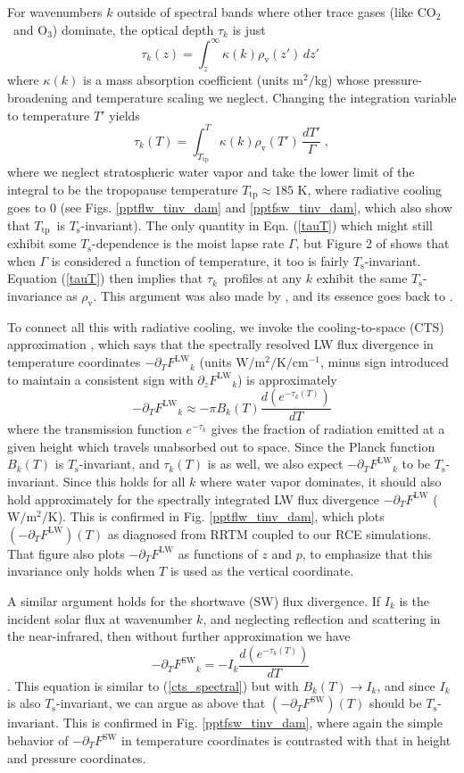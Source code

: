 \documentclass[10pt]{article}
\newcommand{\beqn}{\begin{equation}}
\newcommand{\eeqn}{\end{equation}}
\newcommand{\eqnref}[1]{(\ref{#1})}
\newcommand{\der}[2]{\ensuremath{\frac{d #1}{d #2}}}
\newcommand{\ppz}{\ensuremath{\partial_z}}
\newcommand{\ppt}{\ensuremath{\partial_T}}
\newcommand{\cotwo}{\ensuremath{\mathrm{CO_2}}}
\newcommand{\othree}{\ensuremath{\mathrm{O_3}}}
\newcommand{\FLW}{\ensuremath{F^\mathrm{LW}}}
\newcommand{\FSW}{\ensuremath{F^\mathrm{SW}}}
\newcommand{\cminverse}{\ensuremath{\mathrm{cm^{-1}}}}
\newcommand{\tauk}{\ensuremath{\tau_k}}
\newcommand{\Wmsq}{\ensuremath{\mathrm{W/m^2}}}
\newcommand{\rhov}{\ensuremath{\rho_\mathrm{v}}}
\newcommand{\Ts}{\ensuremath{T_\mathrm{s}}}
\newcommand{\Ttp}{\ensuremath{T_\mathrm{tp}}}
\begin{document}
	For wavenumbers $k$ outside of spectral bands where other trace gases (like \cotwo\ and \othree) dominate, the optical depth $\tauk$ is just
	\beqn
		\tau_k(z) = \int_z^\infty \kappa(k)  \rhov(z') \, dz'  \; 
		\label{tauz}
	\eeqn
		where $\kappa(k)$ is a  mass absorption coefficient  (units $\mathrm{m^2/kg}$) whose pressure-broadening and temperature scaling we neglect. Changing the integration variable to temperature $T'$ yields
		\beqn
		\tau_k(T) = \int_{\Ttp}^T \kappa(k)  \rhov(T') \, \frac{dT'}{\Gamma}  \; ,
		\label{tauT}
	\eeqn
	where we neglect stratospheric water vapor and take the lower limit of the integral to be the tropopause temperature $\Ttp \approx 185$ K, where radiative cooling goes to 0 (see Figs. \ref{pptflw_tinv_dam} and  \ref{pptfsw_tinv_dam}, which also show that \Ttp\ is \Ts-invariant). The only quantity in Eqn. \eqnref{tauT} which might still exhibit some \Ts-dependence is the  moist lapse rate $\Gamma$, but Figure 2 of \cite{ingram2010} shows that when $\Gamma$ is considered a function of temperature, it too is fairly  \Ts-invariant. Equation \eqnref{tauT} then implies that \tauk\ profiles at any $k$ exhibit the same \Ts-invariance as \rhov. This argument was also made by \cite{ingram2010}, and its essence goes back to  \cite{simpson1928}.
	
	To connect all this with radiative cooling, we invoke the cooling-to-space (CTS) approximation \citep[e.g.,][]{thomas2002}, which says that the spectrally resolved LW flux divergence in temperature coordinates $-\ppt \FLW_k$ (units $\Wmsq/\mathrm{K}/\cminverse$, minus sign introduced to maintain a consistent sign with  $\ppz \FLW_k$) is approximately
	\beqn
		-\ppt \FLW_k \approx - \pi B_k(T) \frac{d (e^{-\tauk(T)})}{dT}
	\label{cts_spectral}
	\eeqn
where  the transmission function $e^{-\tauk}$ gives the fraction of radiation emitted at a given height which travels unabsorbed out to space. Since the Planck function $B_k(T)$ is \Ts-invariant, and $\tauk(T)$ is as well, we also expect $-\ppt \FLW_k$ to be \Ts-invariant. Since this holds for all $k$ where water vapor dominates, it should also hold approximately for the spectrally integrated LW flux divergence $-\ppt \FLW$ ($\Wmsq/\mathrm{K}$). This is confirmed in  Fig.  \ref{pptflw_tinv_dam}, which plots $(-\ppt \FLW)(T)$ as diagnosed from RRTM coupled to our  RCE simulations.  That figure also plots $-\ppt \FLW$ as functions of $z$ and $p$, to emphasize that this invariance only holds  when $T$ is used as the vertical coordinate.
	
	A similar argument holds for the shortwave (SW) flux divergence. If $I_k$ is the incident solar flux at wavenumber $k$, and  neglecting reflection and scattering in the  near-infrared, 
then without further approximation we have
	\beqn
		-\ppt \FSW_k = - I_k \der{(e^{-\tauk(T)})}{T}
		\
	\eeqn
\citep[c.f.][eqn. 9.26]{thomas2002}. This equation is similar to  \eqnref{cts_spectral} but with $B_k(T) \rightarrow I_k$, and since $I_k$ is also \Ts-invariant, we can argue as above that $(-\ppt \FSW)(T)$ should be \Ts-invariant. This is confirmed in Fig. \ref{pptfsw_tinv_dam}, where again the simple behavior of $-\ppt \FSW$ in temperature coordinates is contrasted with that in height and pressure coordinates.
\end{document}
